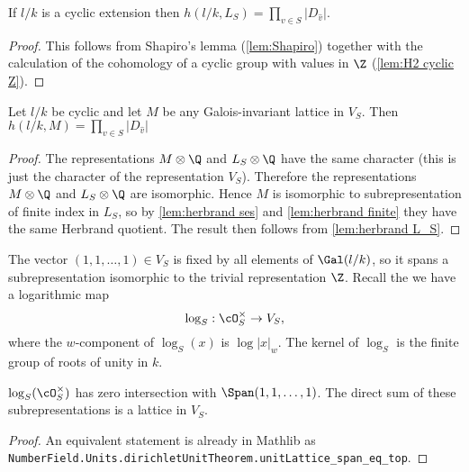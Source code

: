 \begin{lemma} \label{lem:herbrand L_S}
	If $l/k$ is a cyclic extension then
	$h(l/k,L_S) = \prod_{v \in S} |D_{\hat v}|$.
\end{lemma}

\begin{proof}
	This follows from Shapiro's lemma (\ref{lem:Shapiro})
	together with the calculation
	of the cohomology of a cyclic group with values in $\Z$ (\ref{lem:H2 cyclic Z}).
\end{proof}

\begin{lemma} \label{lem:herbrand log lattice}
	Let $l/k$ be cyclic and let $M$ be any Galois-invariant lattice in $V_S$.
	Then $h(l/k,M) = \prod_{v \in S} |D_{\hat v}|$
\end{lemma}

\begin{proof}
	The representations $M \otimes \Q$ and $L_S \otimes \Q$ have the same character
	(this is just the character of the representation $V_S$).
	Therefore the representations $M \otimes \Q$ and $L_S \otimes \Q$ are isomorphic.
	Hence $M$ is isomorphic to subrepresentation of finite index in $L_S$,
	so by \ref{lem:herbrand ses} and \ref{lem:herbrand finite}
	they have the same Herbrand quotient.
	The result then follows from \ref{lem:herbrand L_S}.
\end{proof}


The vector $(1,1,\ldots,1) \in V_S$ is fixed by all elements of $\Gal(l/k)$, so it spans
a subrepresentation isomorphic to the trivial representation $\Z$.
Recall the we have a logarithmic map
\[
	\log_S : \cO_S^\times \to V_S,
\]
where the $w$-component of $\log_S(x)$ is $\log |x|_w$.
The kernel of $\log_S$ is the finite group of roots of unity in $k$.

\begin{theorem} \label{thm:Dirichlet unit theorem}
	$\log_S(\cO_S^\times)$ has zero intersection with $\Span (1,1,\ldots,1)$.
	The direct sum of these subrepresentations is a lattice in $V_S$.
\end{theorem}

\begin{proof}
	An equivalent statement is already in Mathlib as
	\texttt{NumberField.Units.dirichletUnitTheorem.unitLattice\_span\_eq\_top}.
\end{proof}

